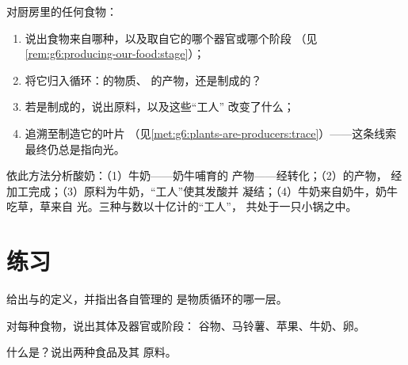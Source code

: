 \begin{method}[读懂食物的来历]\label{met:g6:producing-our-food:read}
对厨房里的任何食物：
\begin{enumerate}
  \item 说出食物来自哪种，以及取自它的哪个器官或哪个阶段
        （见\cref{rem:g6:producing-our-food:stage}）；
  \item 将它归入循环：的物质、
        的产物，还是制成的？
  \item 若是制成的，说出原料，以及这些“工人”
        改变了什么；
  \item 追溯至制造它的叶片
        （见\cref{met:g6:plants-are-producers:trace}）——这条线索
        最终仍总是指向光。
\end{enumerate}
\end{method}

\begin{example}[早餐中的方法]\label{ex:g6:producing-our-food:breakfast}
依此方法分析酸奶：（1）牛奶——奶牛哺育的
产物——经转化；（2）的产物，
经加工完成；（3）原料为牛奶，“工人”使其发酸并
凝结；（4）牛奶来自奶牛，奶牛吃草，草来自
光。三种与数以十亿计的“工人”，
共处于一只小锅之中。
\end{example}

\section{练习}

\begin{exercise}[$\star$]\label{exo:g6:producing-our-food:1}
给出与的定义，并指出各自管理的
是物质循环的哪一层。
\end{exercise}

\begin{exercise}[$\star$]\label{exo:g6:producing-our-food:2}
对每种食物，说出其体及器官或阶段：
谷物、马铃薯、苹果、牛奶、卵。
\end{exercise}

\begin{exercise}[$\star$]\label{exo:g6:producing-our-food:3}
什么是？说出两种食品及其
原料。
\end{exercise}

